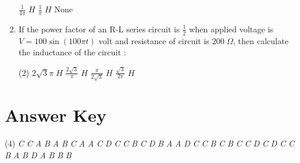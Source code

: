 \documentclass{article}
\begin{document}
\begin{enumerate}
\begin{tasks}
\task \( \displaystyle \frac{1}{4\pi} \;H \)
\task \( \displaystyle \frac{1}{\pi} \;H \)
\task None
\end{tasks}
\item If the power factor of an R-L series circuit is \( \frac{1}{2} \) when applied voltage is \( V = 100 \sin (100\pi t) \) volt and resistance of circuit is \( 200\;\Omega \), then calculate the inductance of the circuit :
\begin{tasks}(2)
\task \( \displaystyle 2\sqrt{3}\pi \;H \)
\task \( \displaystyle \frac{2\sqrt{3}}{\pi} \;H \)
\task \( \displaystyle \frac{\pi}{2\sqrt{3}} \;H \)
\task \( \displaystyle \frac{\sqrt{3}}{2\pi} \;H \)
\end{tasks}
\end{enumerate}
\pagebreak
\centering \section*{Answer Key} 
\begin{tasks}[style=enumerate,after-item-skip=5mm](4)
\task \textit{C}
\task \textit{C}
\task \textit{A}
\task \textit{B}
\task \textit{A}
\task \textit{B}
\task \textit{C}
\task \textit{A}
\task \textit{A}
\task \textit{C}
\task \textit{D}
\task \textit{C}
\task \textit{C}
\task \textit{B}
\task \textit{C}
\task \textit{D}
\task \textit{B}
\task \textit{A}
\task \textit{A}
\task \textit{D}
\task \textit{C}
\task \textit{C}
\task \textit{B}
\task \textit{C}
\task \textit{B}
\task \textit{C}
\task \textit{C}
\task \textit{D}
\task \textit{C}
\task \textit{D}
\task \textit{C}
\task \textit{C}
\task \textit{B}
\task \textit{A}
\task \textit{B}
\task \textit{D}
\task \textit{A}
\task \textit{B}
\task \textit{B}
\task \textit{B}
\end{tasks}
\end{document}
